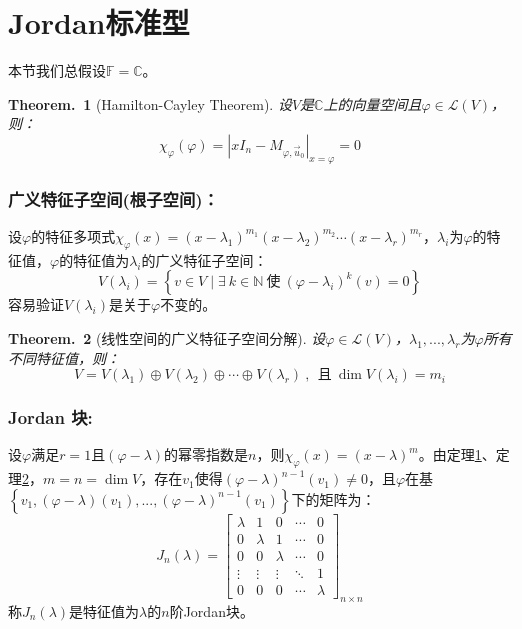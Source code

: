 \documentclass[zihao=5,UTF8]{report}
\theoremstyle{mystyle} %
\newtheorem{theorem}{Theorem.\,}
\begin{document}
\section{Jordan标准型}
本节我们总假设$\mathbb{F} = \mathbb{C}$。
\begin{theorem}[Hamilton-Cayley Theorem]\label{Hamilton-Cayley Theorem}
设$V$是$\mathbb{C}$上的向量空间且$\varphi \in \mathscr{L}(V)$，则：
\begin{equation*}
    \chi_{\varphi}(\varphi) =  \left | xI_n - M_{\varphi,\vec{u}_0}\right |_{x = \varphi}= 0
\end{equation*}

\end{theorem}
\subsubsection{广义特征子空间(根子空间)：}
设$\varphi$的特征多项式$ \chi_{\varphi}(x) = (x-\lambda_1)^{m_1}(x-\lambda_2)^{m_2} \cdots (x-\lambda_r)^{m_r}$，$\lambda_i$为$\varphi$的特征值，$\varphi$的特征值为$\lambda_i$的广义特征子空间：
\begin{equation*}
    V(\lambda_i) = \left\{v\in V\mid \exists\ k \in \mathbb{N}\ \text{使}\ (\varphi - \lambda_i)^k(v) = 0   \right\}
\end{equation*}
容易验证$V(\lambda_i)$是关于$\varphi$不变的。

\begin{theorem}[线性空间的广义特征子空间分解]\label{线性空间的广义特征子空间分解}
设$\varphi \in \mathscr{L}(V)$，$\lambda_1,...,\lambda_r$为$\varphi$所有不同特征值，则：
\begin{equation*}
    V = V(\lambda_1) \oplus V(\lambda_2) \oplus \cdots \oplus V(\lambda_r)\ ,\ \ \text{且}\ \dim V(\lambda_i) = m_i
\end{equation*}
\end{theorem}
\subsubsection{Jordan 块:}
设$\varphi$满足$r=1$且$(\varphi - \lambda)$的幂零指数是$n$，则$\chi_\varphi(x) = (x - \lambda)^m$。由定理\ref{Hamilton-Cayley Theorem}、定理\ref{线性空间的广义特征子空间分解}，$m = n = \dim V$，存在$v_1$使得$(\varphi-\lambda)^{n-1}(v_1) \ne 0$，且$\varphi$在基$\left\{ v_1,(\varphi-\lambda)(v_1),...,(\varphi-\lambda)^{n-1}(v_1) \right\}$下的矩阵为：
\begin{equation*}
    J_n(\lambda) = 
    \begin{bmatrix}
        \lambda&  1&  0&  \cdots&0 \\
        0&  \lambda&  1&  \cdots&0 \\
        0&  0&  \lambda&  \cdots&0 \\
        \vdots&  \vdots&  \vdots&  \ddots & 1\\
        0&  0&  0&  \cdots&\lambda
      \end{bmatrix}_{ n\times n}
\end{equation*}
称$J_n(\lambda)$是特征值为$\lambda$的$n$阶Jordan块。
\end{document}
